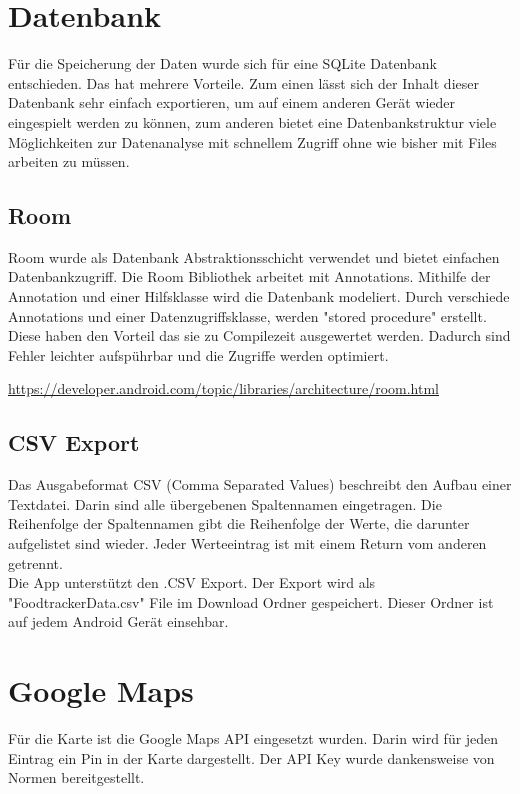 \documentclass[
    DIV12,
    cleardouble=plain,
    headings=normal,
    pdftex,
    headexclude,footexclude,
    final
]{scrreprt}
\begin{document}
\section{Datenbank}
Für die Speicherung der Daten wurde sich für eine SQLite Datenbank entschieden. Das hat mehrere Vorteile. Zum einen lässt sich der Inhalt dieser Datenbank sehr einfach exportieren, um auf einem anderen Gerät wieder eingespielt werden zu können, zum anderen bietet eine Datenbankstruktur viele Möglichkeiten zur Datenanalyse mit schnellem Zugriff ohne wie bisher mit Files arbeiten zu müssen.

\subsection{Room}
Room wurde als Datenbank Abstraktionsschicht verwendet und bietet einfachen Datenbankzugriff. Die Room Bibliothek arbeitet mit Annotations. Mithilfe der Annotation und einer Hilfsklasse wird die Datenbank modeliert. 
Durch verschiede Annotations und einer Datenzugriffsklasse, werden "stored procedure" erstellt.
Diese haben den Vorteil das sie zu Compilezeit ausgewertet werden. Dadurch sind Fehler leichter aufspührbar und die Zugriffe werden optimiert.

\url{https://developer.android.com/topic/libraries/architecture/room.html}


\subsection{CSV Export}
Das Ausgabeformat CSV (Comma Separated Values) beschreibt den Aufbau einer Textdatei. Darin sind alle übergebenen Spaltennamen eingetragen. Die Reihenfolge der Spaltennamen gibt die Reihenfolge der Werte, die darunter aufgelistet sind wieder. Jeder Werteeintrag ist mit einem Return vom anderen getrennt.\\
Die App unterstützt den .CSV Export. Der Export wird als "FoodtrackerData.csv" File im Download Ordner gespeichert.
Dieser Ordner ist auf jedem Android Gerät einsehbar.

\section{Google Maps}
Für die Karte ist die Google Maps API eingesetzt wurden. 
Darin wird für jeden Eintrag ein Pin in der Karte dargestellt.
Der API Key wurde dankensweise von Normen bereitgestellt.
 
\end{document}
